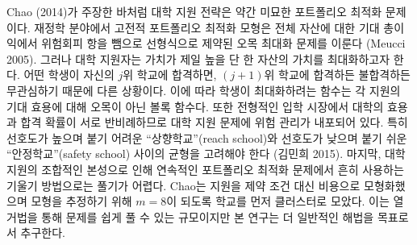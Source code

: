 \documentclass[12pt]{article} %
\newif\ifen
\theoremstyle{definition}
\theoremstyle{definition}
\begin{document}
\ifen
As Chao (2014) remarked, college application represents a somewhat subtle portfolio optimization problem. In computational finance, traditional portfolio optimization models weigh the sum of expected profit across all assets against a risk term, yielding a concave maximization problem with linear constraints (Meucci 2005). But college applicants maximize the value of their \emph{best} asset: If a student is admitted to her $j$th choice, then she is indifferent as to whether she gets into her $(j+1)$th choice. As a result, the valuation function that students maximize is \emph{convex} in the expected utility associated with individual applications. Risk management is implicit in the college application problem because, in a typical admissions market, college preferability is negatively correlated with competitiveness. That is, students negotiate a tradeoff between highly attractive, selective “reach schools” and less preferable “safety schools” where admission is a safer bet (Kim 2015). Finally, the combinatorial nature of the college application problem makes it difficult to solve using the gradient-based techniques used in continuous portfolio optimization. Chao estimated her model (which considers application as a \emph{cost} rather than a constraint) by clustering the schools so that $m=8$, a scale at which enumeration is tractable. Our study pursues a more general solution.
\else
Chao (2014)가 주장한 바처럼 대학 지원 전략은 약간 미묘한 포트폴리오 최적화 문제이다. 재정학 분야에서 고전적 포트폴리오 최적화 모형은 전체 자산에 대한 기대 총이익에서 위험회피 항을 뺌으로 선형식으로 제약된 오목 최대화 문제를 이룬다 (Meucci 2005). 그러나 대학 지원자는 가치가 제일 높을 단 한 자산의 가치를 최대화하고자 한다. 어떤 학생이 자신의 $j$위 학교에 합격하면, $(j+1)$위 학교에 합격하든 불합격하든 무관심하기 때문에 다른 상황이다. 이에 따라 학생이 최대화하려는 함수는 각 지원의 기대 효용에 대해 오목이 아닌 볼록 함수다. 또한 전형적인 입학 시장에서 대학의 효용과 합격 확률이 서로 반비례하므로 대학 지원 문제에 위험 관리가 내포되어 있다. 특히 선호도가 높으며 붙기 어려운 “상향학교”(reach school)와 선호도가 낮으며 붙기 쉬운 “안정학교”(safety school) 사이의 균형을 고려해야 한다 (김민희 2015). 마지막, 대학 지원의 조합적인 본성으로 인해 연속적인 포트폴리오 최적화 문제에서 흔히 사용하는 기울기 방법으로는 풀기가 어렵다. Chao는 지원을 제약 조건 대신 비용으로 모형화했으며 모형을 추정하기 위해 $m=8$이 되도록 학교를 먼저 클러스터로 모았다. 이는 열거법을 통해 문제를 쉽게 풀 수 있는 규모이지만 본 연구는 더 일반적인 해법을 목표로서 추구한다.
\fi
\end{document}
